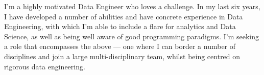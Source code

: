 \documentclass[a4paper]{limecv}
\begin{document}
  
  \begin{cvSidebar}
   

    \begin{cvContact}
    \end{cvContact}
  
    \begin{cvProfile}
      \begin{flushleft}
      I'm a highly motivated Data Engineer who loves a challenge. In my last six years, I have developed a number of abilities and have concrete experience in Data Engineering, with which I'm able to include
      a flare for analytics and Data Science, as well as being well aware of good programming paradigms. I'm seeking
      a role that encompasses the above — one where I can border a number of disciplines and join a large multi-disciplinary team, whilst being centred on rigorous data engineering.
      \end{flushleft}
    \end{cvProfile}
    
    \begin{cvLanguages}
    \end{cvLanguages}
    
    \begin{cvInterests}[short]
      \cvInterestsProfessional
      \cvInterestsPersonal
    \end{cvInterests}
    
    
  \end{cvSidebar}
\end{document}
